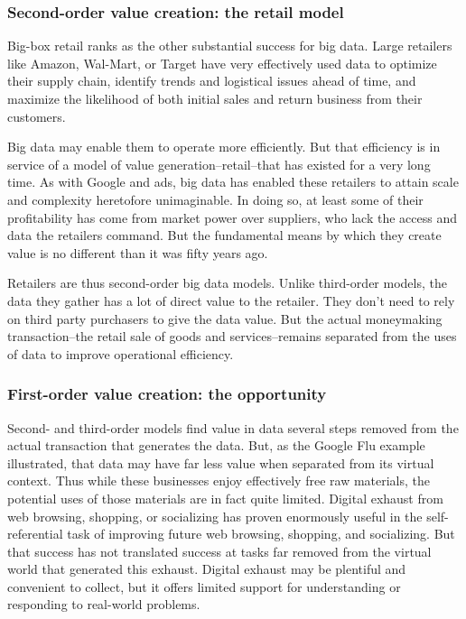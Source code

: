 \documentclass[12pt]{article}
\begin{document}
\subsubsection{Second-order value creation: the retail model}
\label{sec:second-order-value}


Big-box retail ranks as the other substantial success for big
data. Large retailers like Amazon, Wal-Mart, or Target have very
effectively used data to optimize their supply chain, identify trends
and logistical issues ahead of time, and maximize the likelihood of
both initial sales and return business from their customers. 

Big data
may enable them to operate more efficiently. But that efficiency is in
service of a model of value generation--retail--that has existed for a
very long time. As with Google and ads, big data has enabled these
retailers to attain scale and complexity heretofore unimaginable. In
doing so, at least some of their profitability has come from market
power over suppliers, who lack the access and data the retailers
command. But the fundamental means by which they create value is no
different than it was fifty years ago.

Retailers are thus second-order big data models. Unlike third-order
models, the data they gather has a lot of direct value to the
retailer. They don't need to rely on third party purchasers to give
the data value. But the actual moneymaking transaction--the retail
sale of goods and services--remains separated from the uses of data to
improve operational efficiency. 

\subsubsection{First-order value creation: the opportunity}
\label{sec:first-order-value}

Second- and third-order models find value in data
several steps removed from the actual transaction that generates the
data. But, as the Google Flu example illustrated, that data may have
far less value when separated from its virtual context. Thus while
these businesses enjoy effectively free raw materials, the potential
uses of those materials are in fact quite limited. Digital exhaust
from web browsing, shopping, or socializing has proven enormously
useful in the self-referential task of improving future web browsing, shopping, and
socializing. But that success has not translated success at tasks far
removed from the virtual world that generated this exhaust. Digital
exhaust may be plentiful and convenient to collect, but it offers
limited support for understanding or responding to real-world problems.
\end{document}
